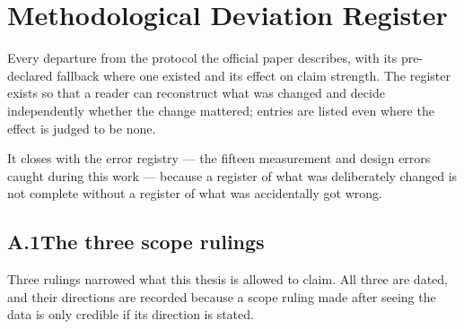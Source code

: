 \chapter{Methodological Deviation Register}
\label{app:deviations}

Every departure from the protocol the official paper describes, with its
pre-declared fallback where one existed and its effect on claim strength.
The register exists so that a reader can reconstruct what was changed and
decide independently whether the change mattered; entries are listed even
where the effect is judged to be none.

It closes with the error registry --- the fifteen measurement and design
errors caught during this work --- because a register of what was
deliberately changed is not complete without a register of what was
accidentally got wrong.

\section*{A.1\quad The three scope rulings}

Three rulings narrowed what this thesis is allowed to claim. All three are
dated, and their directions are recorded because a scope ruling made after
seeing the data is only credible if its direction is stated.

